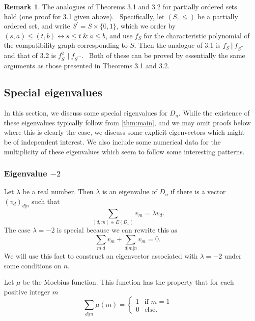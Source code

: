 \documentclass[11pt,a4paper]{amsart}
\theoremstyle{definition}
\newtheorem{rem}[thm]{Remark}
\numberwithin{equation}{section}
\begin{document}
\begin{rem}
The analogues of Theorems 3.1 and 3.2 for partially ordered sets hold (one
proof for 3.1 given above). \ Specifically, let $(S,\leq )$ be a partially
ordered set, and write $S^{\prime }=S\times \{0,1\}$, which we order by $%
(s,a)\leq (t,b)\leftrightarrow s\leq t\ \&~a\leq b$, and use $f_{S}$ for the
characteristic polynomial of the compatibility graph corresponding to $S.$
Then the analogue of 3.1 is $f_{S}~|~f_{S^{\prime \prime }}$ and that of 3.2
is $f_{S^{\prime }}^{2}~|~f_{S^{\prime \prime \prime }}$. \ Both of these
can be proved by essentially the same arguments as those presented in
Theorems 3.1 and 3.2.
\end{rem}
\subsection{Special eigenvalues}
In this section, we discuss some special eigenvalues for $D_n.$ While the existence of these eigenvalues typically follow from \cref{thm:main}, and we may omit proofs below where this is clearly the case, we discuss some explicit eigenvectors which might be of independent interest. We also include some  numerical data for the multiplicity of these eigenvalues which seem to follow some interesting patterns.

\subsubsection{Eigenvalue $-2$}
Let $\lambda$ be a real number. Then $\lambda$ is an eigenvalue of $D_n$ if there is a vector $(v_d)_{d|n}$ such that 
\[ \sum_{(d,m) \in E(D_n)} v_m = \lambda v_d. \]
The case $\lambda=-2$ is special because we can rewrite this as 
\begin{equation} \label{eq:moebius}
\sum_{m|d} v_m + \sum_{d|m|n} v_m =0.
\end{equation}
We will use this fact to construct an eigenvector associated with $\lambda =-2$ under some conditions on $n.$ 


Let $\mu$ be the Moebius function. This function has the property that for each positive integer $m$
   \[
\sum_{d|m} \mu(m) =
\begin{cases} 
    1 & \text{if } m=1 \\
    0 & \text{else. }
\end{cases}
\]
\end{document}
